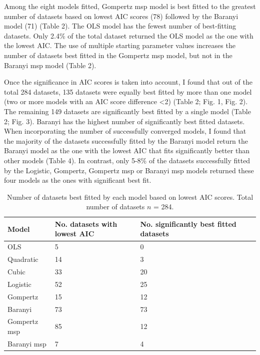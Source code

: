 \documentclass[11pt]{article}
\begin{document}
Among the eight models fitted, Gompertz msp model is best fitted to the greatest number of datasets based on lowest AIC scores (78) followed by the Baranyi model (71) (Table 2). The OLS model has the fewest number of best-fitting datasets. Only 2.4\% of the total dataset returned the OLS model as the one with the lowest AIC. The use of multiple starting parameter values increases the number of datasets best fitted in the Gompertz msp model, but not in the Baranyi msp model (Table 2).
\vspace{\baselineskip}

Once the significance in AIC scores is taken into account, I found that out of the total 284 datasets, 135 datasets were equally best fitted by more than one model (two or more models with an AIC score difference <2) (Table 2; Fig. 1, Fig. 2). The remaining 149 datasets are significantly best fitted by a single model (Table 2; Fig. 3). Baranyi has the highest number of significantly best fitted datasets. When incorporating the number of successfully converged models, I found that the majority of the datasets successfully fitted by the Baranyi model return the Baranyi model as the one with the lowest AIC that fits significantly better than other models (Table 4). In contrast, only 5-8\% of the datasets successfully fitted by the Logistic, Gompertz, Gompertz msp or Baranyi msp models returned these four models as the ones with significant best fit.
\vspace{\baselineskip}

\begin{table}[]
\caption{Number of datasets best fitted by each model based on lowest AIC scores. Total number of datasets \(n\) = 284.}
\begin{tabular}{@{}lllll@{}}
\toprule
Model        & No. datasets with lowest AIC & No. significantly best fitted datasets &  &  \\ \midrule
OLS          & 5                            & 0                                      &  &  \\
Quadratic    & 14                           & 3                                      &  &  \\
Cubic        & 33                           & 20                                     &  &  \\
Logistic     & 52                           & 25                                     &  &  \\
Gompertz     & 15                           & 12                                     &  &  \\ 
Baranyi      & 73                           & 73                                     &  &  \\
Gompertz msp & 85                           & 12                                     &  &  \\
Baranyi msp  & 7                            & 4                                      &  & 
\end{tabular}
\end{table}
\end{document}
